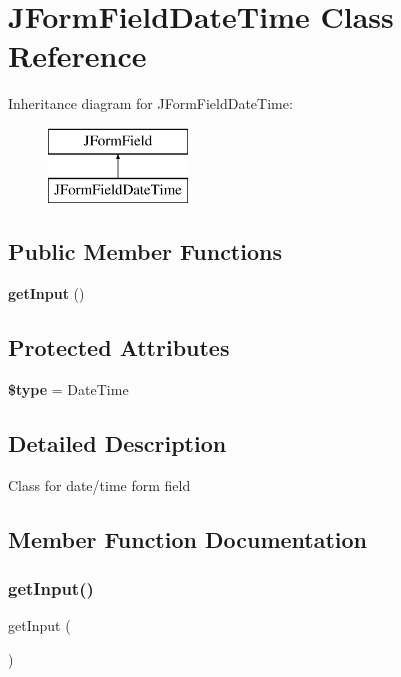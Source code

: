 \section{J\+Form\+Field\+Date\+Time Class Reference}
\label{class_j_form_field_date_time}
Inheritance diagram for J\+Form\+Field\+Date\+Time\+:\begin{figure}[H]
\begin{center}
\leavevmode
\includegraphics[height=2.000000cm]{class_j_form_field_date_time}
\end{center}
\end{figure}
\subsection*{Public Member Functions}
\begin{DoxyCompactItemize}
\item 
\textbf{ get\+Input} ()
\end{DoxyCompactItemize}
\subsection*{Protected Attributes}
\begin{DoxyCompactItemize}
\item 
\textbf{ \$type} = \textquotesingle{}Date\+Time\textquotesingle{}
\end{DoxyCompactItemize}


\subsection{Detailed Description}
Class for date/time form field 

\subsection{Member Function Documentation}
\mbox{\label{class_j_form_field_date_time_a4380f30ae9202fa49ebd2439572f9cdb}} 
\subsubsection{get\+Input()}
{\footnotesize\ttfamily get\+Input (\begin{DoxyParamCaption}{ }\end{DoxyParamCaption})}

